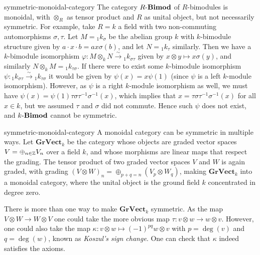 \begin{example}{symmetric-monoidal-category}
    The category $R\textup{-}\textbf{Bimod}$ of $R$-bimodules is monoidal, with $\otimes_R$ as tensor product and $R$ as unital object, but not necessarily symmetric. For example, take $R = k$ a field with two non-commuting automorphisms $\sigma, \tau$. Let $M = {}_1 k_\sigma$ be the abelian group $k$ with $k$-bimodule structure given by $a \cdot x \cdot b = ax \sigma(b)$, and let $N = {}_1 k_\tau$ similarly. Then we have a $k$-bimodule isomorphism $\varphi : M \otimes_k N \xrightarrow{\sim} {}_1 k_{\sigma \tau}$ given by $x \otimes y \mapsto x \sigma(y)$, and similarly $N \otimes_k M = {}_1 k_{\tau \sigma}$. If there were to exist some $k$-bimodule isomorphism $\psi : {}_1 k_{\sigma \tau} \xrightarrow{\sim} {}_1 k_{\tau \sigma}$ it would be given by $\psi(x) = x \psi(1)$ (since $\psi$ is a left $k$-module isomorphism). However, as $\psi$ is a right $k$-module isomorphism as well, we must have $\psi(x) = \psi(1) \tau \sigma \tau^{-1} \sigma^{-1} (x)$, which implies that $x = \tau \sigma \tau^{-1} \sigma^{-1} (x)$ for all $x \in k$, but we assumed $\tau$ and $\sigma$ did not commute. Hence such $\psi$ does not exist, and $k\textup{-}\textbf{Bimod}$ cannot be symmetric.
\end{example}

\begin{example}{symmetric-monoidal-category}
    A monoidal category can be symmetric in multiple ways. Let $\textbf{GrVect}_k$ be the category whose objects are graded vector spaces $V = \oplus_{n \in \mathbb{Z}} V_n$ over a field $k$, and whose morphisms are linear maps that respect the grading. The tensor product of two graded vector spaces $V$ and $W$ is again graded, with grading $(V \otimes W)_n = \oplus_{p + q = n} (V_p \otimes W_q)$, making $\textbf{GrVect}_k$ into a monoidal category, where the unital object is the ground field $k$ concentrated in degree zero.
        
    There is more than one way to make $\textbf{GrVect}_k$ symmetric. As the map $V \otimes W \to W \otimes V$ one could take the more obvious map $\tau : v \otimes w \to w \otimes v$. However, one could also take the map $\kappa : v \otimes w \mapsto (-1)^{pq} w \otimes v$ with $p = \deg(v)$ and $q = \deg(w)$, known as \textit{Koszul's sign change}. One can check that $\kappa$ indeed satisfies the axioms.
\end{example}

